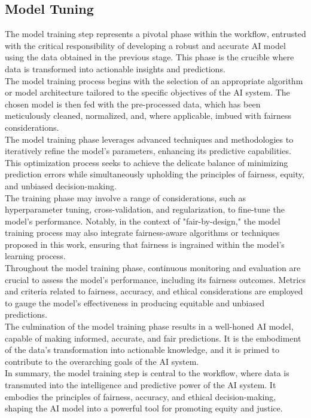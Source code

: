 \documentclass[12pt,a4paper,openright,twoside]{book}
\begin{document}
\subsection{Model Tuning}
The model training step represents a pivotal phase within the workflow, entrusted with the critical responsibility of developing a robust and accurate AI model using the data obtained in the previous stage. This phase is the crucible where data is transformed into actionable insights and predictions. \\
The model training process begins with the selection of an appropriate algorithm or model architecture tailored to the specific objectives of the AI system. The chosen model is then fed with the pre-processed data, which has been meticulously cleaned, normalized, and, where applicable, imbued with fairness considerations. \\
The model training phase leverages advanced techniques and methodologies to iteratively refine the model's parameters, enhancing its predictive capabilities. This optimization process seeks to achieve the delicate balance of minimizing prediction errors while simultaneously upholding the principles of fairness, equity, and unbiased decision-making. \\
The training phase may involve a range of considerations, such as hyperparameter tuning, cross-validation, and regularization, to fine-tune the model's performance. Notably, in the context of "fair-by-design," the model training process may also integrate fairness-aware algorithms or techniques proposed in this work, ensuring that fairness is ingrained within the model's learning process. \\
Throughout the model training phase, continuous monitoring and evaluation are crucial to assess the model's performance, including its fairness outcomes. Metrics and criteria related to fairness, accuracy, and ethical considerations are employed to gauge the model's effectiveness in producing equitable and unbiased predictions. \\
The culmination of the model training phase results in a well-honed AI model, capable of making informed, accurate, and fair predictions. It is the embodiment of the data's transformation into actionable knowledge, and it is primed to contribute to the overarching goals of the AI system. \\
In summary, the model training step is central to the workflow, where data is transmuted into the intelligence and predictive power of the AI system. It embodies the principles of fairness, accuracy, and ethical decision-making, shaping the AI model into a powerful tool for promoting equity and justice.
\end{document}
